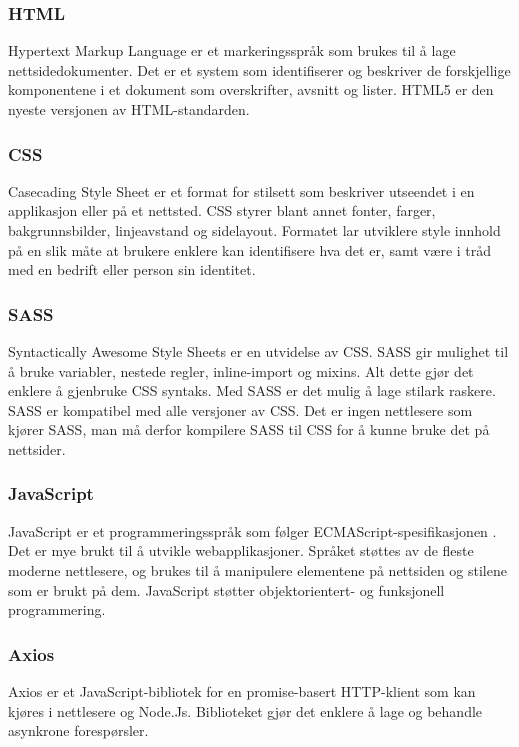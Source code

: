 \subsubsection{HTML}
Hypertext Markup Language \cite{w3c2016hc} er et markeringsspråk som brukes til å lage nettsidedokumenter. Det er et system som identifiserer og beskriver de forskjellige komponentene i et dokument som overskrifter, avsnitt og lister. HTML5 er den nyeste versjonen av HTML-standarden.

\subsubsection{CSS}
Casecading Style Sheet \cite{w3c2016hc} er et format for stilsett som beskriver utseendet i en applikasjon eller på et nettsted. CSS styrer blant annet fonter, farger, bakgrunnsbilder, linjeavstand og sidelayout. Formatet lar utviklere style innhold på en slik måte at brukere enklere kan identifisere hva det er, samt være i tråd med en bedrift eller person sin identitet.

\subsubsection{SASS}
Syntactically Awesome Style Sheets \cite{Catlin2006cws} er en utvidelse av CSS. SASS gir mulighet til å bruke variabler, nestede regler, inline-import og mixins. Alt dette gjør det enklere å gjenbruke CSS syntaks. Med SASS er det mulig å lage stilark raskere. SASS er kompatibel med alle versjoner av CSS. Det er ingen nettlesere som kjører SASS, man må derfor kompilere SASS til CSS for å kunne bruke det på nettsider.

\subsubsection{JavaScript}
JavaScript er et programmeringsspråk som følger ECMAScript-spesifikasjonen \cite{mdn2019jav}. Det er mye brukt til å utvikle webapplikasjoner. Språket støttes av de fleste moderne nettlesere, og brukes til å manipulere elementene på nettsiden og stilene som er brukt på dem. JavaScript støtter objektorientert- og funksjonell programmering.

\subsubsection{Axios}
\label{sec:tool:axios}
Axios\cite{axios2019a} er et JavaScript-bibliotek for en promise-basert HTTP-klient som kan kjøres i nettlesere og Node.Js. Biblioteket gjør det enklere å lage og behandle asynkrone forespørsler.


